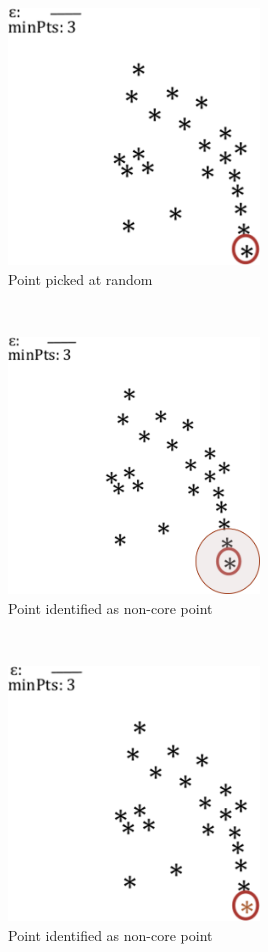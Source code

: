 \documentclass[20pt,landscape,footrule,headrule]{foils}
\begin{document}
{{\newpage\ 
\begin{center}
\includegraphics[width=0.5\textwidth]{Images/dbscan15} \\ Point picked at random
\end{center}

\newpage\ 
\begin{center}
\includegraphics[width=0.5\textwidth]{Images/dbscan2} \\ Point identified as non-core point
\end{center}

\newpage\ 
\begin{center}
\includegraphics[width=0.5\textwidth]{Images/dbscan3} \\ Point identified as non-core point
\end{center}

}}
\end{document}

